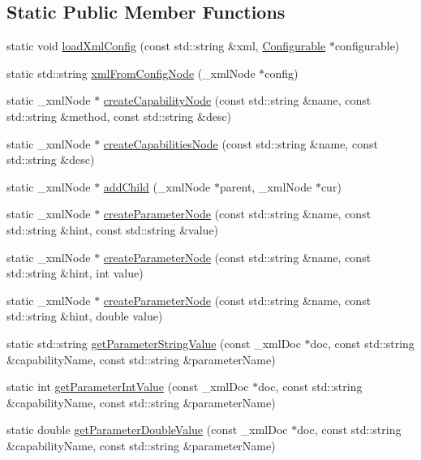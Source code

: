 \subsection*{Static Public Member Functions}
\begin{DoxyCompactItemize}
\item 
static void \hyperlink{classrr_1_1_configurable_aa3ecf478d5b6ef58967ff45dd13623d2}{load\-Xml\-Config} (const std\-::string \&xml, \hyperlink{classrr_1_1_configurable}{Configurable} $\ast$configurable)
\item 
static std\-::string \hyperlink{classrr_1_1_configurable_a326b7f6db697fb213908234b0135b93b}{xml\-From\-Config\-Node} (\-\_\-xml\-Node $\ast$config)
\item 
static \-\_\-xml\-Node $\ast$ \hyperlink{classrr_1_1_configurable_a1cf1d4c3086683eb8ba5e326f90eb9dd}{create\-Capability\-Node} (const std\-::string \&name, const std\-::string \&method, const std\-::string \&desc)
\item 
static \-\_\-xml\-Node $\ast$ \hyperlink{classrr_1_1_configurable_a8b2199153c22d156ead39f72955f5911}{create\-Capabilities\-Node} (const std\-::string \&name, const std\-::string \&desc)
\item 
static \-\_\-xml\-Node $\ast$ \hyperlink{classrr_1_1_configurable_ad25336b103d9821c24be9131b5be65db}{add\-Child} (\-\_\-xml\-Node $\ast$parent, \-\_\-xml\-Node $\ast$cur)
\item 
static \-\_\-xml\-Node $\ast$ \hyperlink{classrr_1_1_configurable_ab4b9e1d503929f9852c193a3109f4fd1}{create\-Parameter\-Node} (const std\-::string \&name, const std\-::string \&hint, const std\-::string \&value)
\item 
static \-\_\-xml\-Node $\ast$ \hyperlink{classrr_1_1_configurable_a98ac3ed5609f816743b4001eab12a15e}{create\-Parameter\-Node} (const std\-::string \&name, const std\-::string \&hint, int value)
\item 
static \-\_\-xml\-Node $\ast$ \hyperlink{classrr_1_1_configurable_a9549b987e35cebb539e06fe05c7bdedb}{create\-Parameter\-Node} (const std\-::string \&name, const std\-::string \&hint, double value)
\item 
static std\-::string \hyperlink{classrr_1_1_configurable_affc794880c1fa037539465ca703ebd1f}{get\-Parameter\-String\-Value} (const \-\_\-xml\-Doc $\ast$doc, const std\-::string \&capability\-Name, const std\-::string \&parameter\-Name)
\item 
static int \hyperlink{classrr_1_1_configurable_ac64a27f007da8352b045495224724592}{get\-Parameter\-Int\-Value} (const \-\_\-xml\-Doc $\ast$doc, const std\-::string \&capability\-Name, const std\-::string \&parameter\-Name)
\item 
static double \hyperlink{classrr_1_1_configurable_afbbe4dea6032d20b303f58fe5cb6dc6f}{get\-Parameter\-Double\-Value} (const \-\_\-xml\-Doc $\ast$doc, const std\-::string \&capability\-Name, const std\-::string \&parameter\-Name)
\end{DoxyCompactItemize}


